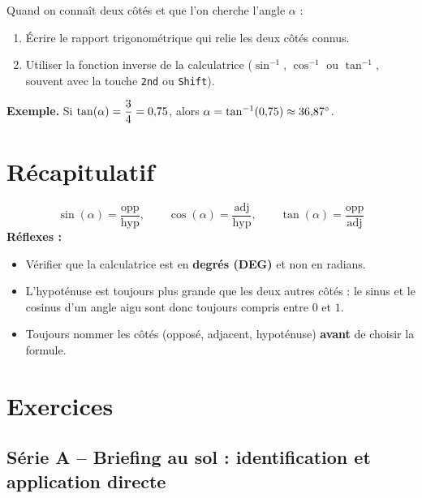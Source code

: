 \documentclass[../main.tex]{subfiles}
\begin{document}
\begin{methode}
Quand on connaît deux côtés et que l'on cherche l'angle $\alpha$ :
\begin{enumerate}
  \item Écrire le rapport trigonométrique qui relie les deux côtés connus.
  \item Utiliser la fonction inverse de la calculatrice ($\sin^{-1}$, $\cos^{-1}$ ou $\tan^{-1}$, souvent avec la touche \texttt{2nd} ou \texttt{Shift}).
\end{enumerate}
\end{methode}

\textbf{Exemple.} Si $\tan(\alpha) = \dfrac{3}{4} = 0{,} 75$, alors $\alpha = \tan^{-1}(0{,} 75) \approx 36{,} 87^\circ$.

\section{Récapitulatif}

\begin{tcolorbox}[colback=gray!6,colframe=gray!60!black,title={\bfseries À retenir}]
\[
\sin(\alpha) = \frac{\text{opp}}{\text{hyp}}, \qquad \cos(\alpha) = \frac{\text{adj}}{\text{hyp}}, \qquad \tan(\alpha) = \frac{\text{opp}}{\text{adj}}
\]
\textbf{Réflexes :}
\begin{itemize}
  \item Vérifier que la calculatrice est en \textbf{degrés (DEG)} et non en radians.
  \item L'hypoténuse est toujours plus grande que les deux autres côtés : le sinus et le cosinus d'un angle aigu sont donc toujours compris entre $0$ et $1$.
  \item Toujours nommer les côtés (opposé, adjacent, hypoténuse) \textbf{avant} de choisir la formule.
\end{itemize}
\end{tcolorbox}

\newpage
\section{Exercices}

\subsection{Série A -- Briefing au sol : identification et application directe}
\end{document}
